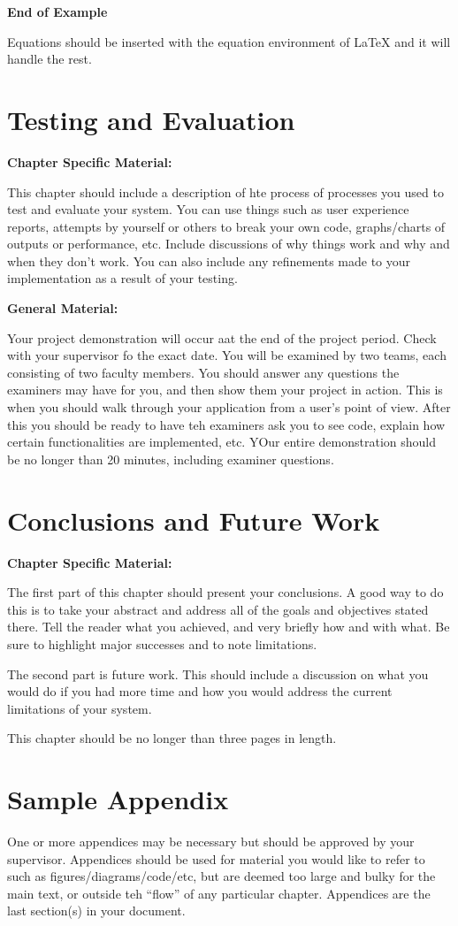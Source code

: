 \documentclass{report}[a4paper,12pt,onecolumn]
\begin{document}
\textbf{End of Example}

Equations should be inserted with the equation environment of LaTeX and it will 
handle the rest.


\chapter{Testing and Evaluation}

\textbf{Chapter Specific Material:}

This chapter should include a description of hte process of processes you used 
to test and evaluate your system. You can use things such as user experience 
reports, attempts by yourself or others to break your own code, graphs/charts 
of outputs or performance, etc. Include discussions of why things work and why 
and when they don't work. You can also include any refinements made to your 
implementation as a result of your testing.

\textbf{General Material:}

Your project demonstration will occur aat the end of the project period. Check 
with your supervisor fo the exact date. You will be examined by two teams, each 
consisting of two faculty members. You should answer any questions the 
examiners may have for you, and then show them your project in action. This is 
when you should walk through your application from a user's point of view. 
After this you should be ready to have teh examiners ask you to see code, 
explain how certain functionalities are implemented, etc. YOur entire 
demonstration should be no longer than 20 minutes, including examiner 
questions.

\chapter{Conclusions and Future Work}

\textbf{Chapter Specific Material:}

The first part of this chapter should present your conclusions. A good way to 
do this is to take your abstract and address all of the goals and objectives 
stated there. Tell the reader what you achieved, and very briefly how and with 
what. Be sure to highlight major successes and to note limitations.

The second part is future work. This should include a discussion on what you 
would do if you had more time and how you would address the current limitations 
of your system.

This chapter should be no longer than three pages in length.




\appendix
\chapter{Sample Appendix}

One or more appendices may be necessary but should be approved by your 
supervisor. Appendices should be used for material you would like to refer to 
such as figures/diagrams/code/etc, but are deemed too large and bulky for the 
main text, or outside teh ``flow'' of any particular chapter. Appendices are 
the last section(s) in your document.
\end{document}

